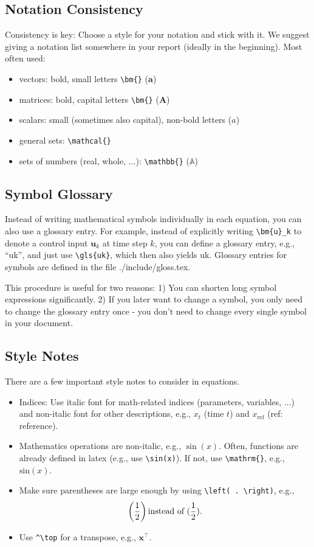 \subsection{Notation Consistency}

Consistency is key: Choose a style for your notation and stick with it. We suggest giving a notation list somewhere in your report (ideally in the beginning). 
Most often used:
\begin{itemize}
	\item vectors: bold, small letters \verb|\bm{}| ($\bm{a}$)
	\item matrices: bold, capital letters \verb|\bm{}| ($\bm{A}$)
	\item scalars: small (sometimes also capital), non-bold letters ($a$)
	\item general sets: \verb|\mathcal{}|
	\item sets of numbers (real, whole, $\ldots$): \verb|\mathbb{}| ($\mathbb{A}$)
\end{itemize}

\subsection{Symbol Glossary}

Instead of writing mathematical symbols individually in each equation, you can also use a glossary entry. For example, instead of explicitly writing \verb|\bm{u}_k| to denote a control input $\bm{u}_k$ at time step $k$, you can define a glossary entry, e.g., ``uk'', and just use \verb|\gls{uk}|, which then also yields \gls{uk}. Glossary entries for symbols are defined in the file ./include/gloss.tex.

This procedure is useful for two reasons: 1) You can shorten long symbol expressions significantly. 2) If you later want to change a symbol, you only need to change the glossary entry once - you don't need to change every single symbol in your document.

\subsection{Style Notes}

There are a few important style notes to consider in equations.
\begin{itemize}
\item Indices: Use italic font for math-related indices (parameters, variables, ...) and non-italic font for other descriptions, e.g., $x_t$ (time $t$) and $x_{\text{ref}}$ (ref: reference).
\item Mathematics operations are non-italic, e.g., $\sin(x)$. Often, functions are already defined in latex (e.g., use \verb|\sin(x)|). If not, use \verb|\mathrm{}|, e.g., $\mathrm{sin}(x)$.
\item Make sure parentheses are large enough by using \verb|\left( . \right)|, e.g., \[\left( \frac{1}{2} \right) \textnormal{instead of } ( \frac{1}{2} ) .\]
\item Use \verb|^\top| for a transpose, e.g., $\bm{x}^\top$.
\end{itemize}



